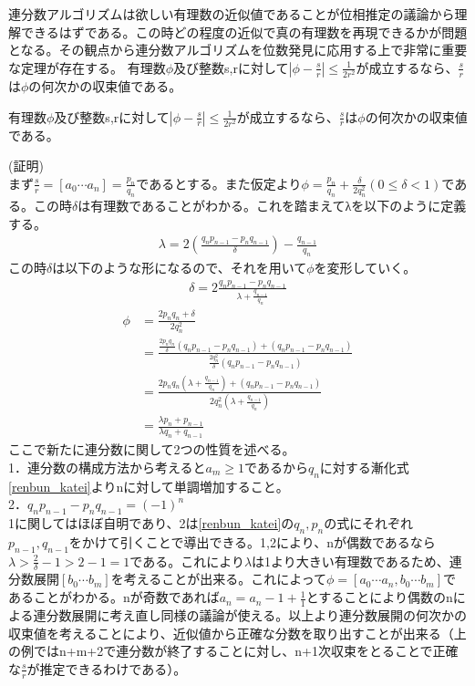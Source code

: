 \documentclass[a4paper,10.5pt]{article}
\numberwithin{equation}{section}
\begin{document}
連分数アルゴリズムは欲しい有理数の近似値であることが位相推定の議論から理解できるはずである。この時どの程度の近似で真の有理数を再現できるかが問題となる。その観点から連分数アルゴリズムを位数発見に応用する上で非常に重要な定理が存在する。
有理数$\phi$及び整数s,rに対して$|\phi -\frac{s}{r}|\leq \frac{1}{2r^{2}}$が成立するなら、$\frac{s}{r}$は$\phi$の何次かの収束値である。
\begin{screen}
有理数$\phi$及び整数s,rに対して$|\phi -\frac{s}{r}|\leq \frac{1}{2r^{2}}$が成立するなら、$\frac{s}{r}$は$\phi$の何次かの収束値である。
\end{screen}
(証明)\\
まず$\frac{s}{r}=[a_{0}\cdots a_{n}]=\frac{p_{n}}{q_{n}}$であるとする。また仮定より$\phi = \frac{p_{n}}{q_{n}} +\frac{\delta}{2q_{n}^{2}}(0\leq \delta <1)$である。この時$\delta$は有理数であることがわかる。これを踏まえてλを以下のように定義する。
\begin{equation}\begin{split}
    \lambda = 2(\frac{q_{n}p_{n-1}-p_{n}q_{n-1}}{\delta})-\frac{q_{n-1}}{q_{n}}
\end{split} \end{equation}
この時$\delta$は以下のような形になるので、それを用いて$\phi$を変形していく。
\begin{equation}\begin{split}
    \delta = 2\frac{q_{n}p_{n-1}-p_{n}q_{n-1}}{\lambda+\frac{q_{n-1}}{q_{n}}}
\end{split} \end{equation}
\begin{equation}\begin{split}
    \phi &= \frac{2p_{n}q_{n}+\delta}{2q_{n}^{2}}\\
    &= \frac{\frac{2p_{n}q_{n}}{\delta}(q_{n}p_{n-1}-p_{n}q_{n-1})+(q_{n}p_{n-1}-p_{n}q_{n-1})}{\frac{2q_{n}^{2}}{\delta}(q_{n}p_{n-1}-p_{n}q_{n-1})}\\
    &=\frac{2p_{n}q_{n}(\lambda+\frac{q_{n-1}}{q_{n}})+(q_{n}p_{n-1}-p_{n}q_{n-1})}{2q_{n}^{2}(\lambda+\frac{q_{n-1}}{q_{n}})}\\
    &=\frac{\lambda p_{n}+p_{n-1}}{\lambda q_{n}+q_{n-1}}
\end{split} \end{equation}
ここで新たに連分数に関して2つの性質を述べる。\\
1．連分数の構成方法から考えると$a_{m}\geq1$であるから$q_{n}$に対する漸化式\eqref{renbun_katei}よりnに対して単調増加すること。\\
2．$q_{n}p_{n-1}-p_{n}q_{n-1}=(-1)^{n}$\\
1に関してはほぼ自明であり、2は\eqref{renbun_katei}の$q_{n},p_{n}$の式にそれぞれ$p_{n-1},q_{n-1}$をかけて引くことで導出できる。1,2により、nが偶数であるなら$\lambda > \frac{2}{\delta}-1 >2-1=1$である。これにより$\lambda$は1より大きい有理数であるため、連分数展開$[b_{0}\cdots b_{m}]$を考えることが出来る。これによって$\phi=[a_{0}\cdots a_{n},b_{0}\cdots b_{m}]$であることがわかる。nが奇数であれば$a_{n}=a_{n}-1 +\frac{1}{1}$とすることにより偶数のnによる連分数展開に考え直し同様の議論が使える。以上より連分数展開の何次かの収束値を考えることにより、近似値から正確な分数を取り出すことが出来る（上の例ではn+m+2で連分数が終了することに対し、n+1次収束をとることで正確な$\frac{s}{r}$が推定できるわけである）。
\end{document}

